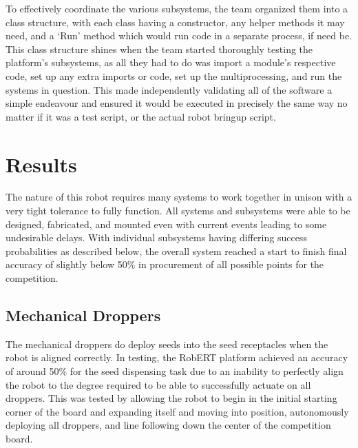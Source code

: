 \documentclass[11pt, hidelinks]{report}
\begin{document}
To effectively coordinate the various subsystems, the team organized them into a class structure, with each class having a constructor, any helper methods it may need, and a ‘Run’ method which would run code in a separate process, if need be. This class structure shines when the team started thoroughly testing the platform’s subsystems, as all they had to do was import a module’s respective code, set up any extra imports or code, set up the multiprocessing, and run the systems in question. This made independently validating all of the software a simple endeavour and ensured it would be executed in precisely the same way no matter if it was a test script, or the actual robot bringup script.


\section{Results}
The nature of this robot requires many systems to work together in unison with a very tight tolerance to fully function. All systems and subsystems were able to be designed, fabricated, and mounted even with current events leading to some undesirable delays. With individual subsystems having differing success probabilities as described below, the overall system reached a start to finish final accuracy of slightly below 50\% in procurement of all possible points for the competition.

\subsection{Mechanical Droppers}
The mechanical droppers do deploy seeds into the seed receptacles when the robot is aligned correctly. In testing, the RobERT platform achieved an accuracy of around 50\% for the seed dispensing task due to an inability to perfectly align the robot to the degree required to be able to successfully actuate on all droppers. This was tested by allowing the robot to begin in the initial starting corner of the board and expanding itself and moving into position, autonomously deploying all droppers, and line following down the center of the competition board.
\end{document}
